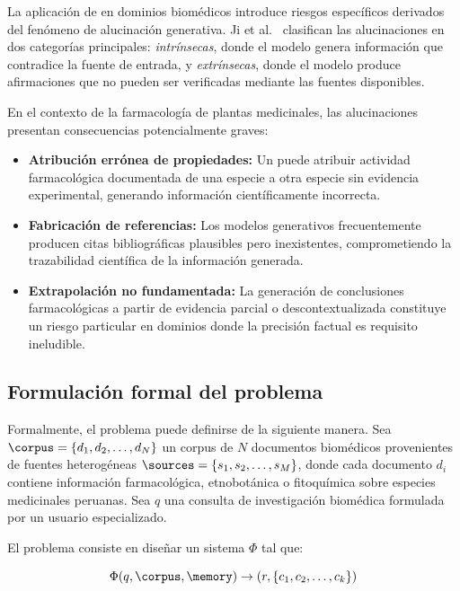 La aplicación de \llms{} en dominios biomédicos introduce riesgos específicos derivados del fenómeno de alucinación generativa. Ji et al.~\cite{ji2023survey} clasifican las alucinaciones en dos categorías principales: \textit{intrínsecas}, donde el modelo genera información que contradice la fuente de entrada, y \textit{extrínsecas}, donde el modelo produce afirmaciones que no pueden ser verificadas mediante las fuentes disponibles.

En el contexto de la farmacología de plantas medicinales, las alucinaciones presentan consecuencias potencialmente graves:

\begin{itemize}[leftmargin=*]
  \item \textbf{Atribución errónea de propiedades:} Un \llm{} puede atribuir actividad farmacológica documentada de una especie a otra especie sin evidencia experimental, generando información científicamente incorrecta.

  \item \textbf{Fabricación de referencias:} Los modelos generativos frecuentemente producen citas bibliográficas plausibles pero inexistentes, comprometiendo la trazabilidad científica de la información generada.

  \item \textbf{Extrapolación no fundamentada:} La generación de conclusiones farmacológicas a partir de evidencia parcial o descontextualizada constituye un riesgo particular en dominios donde la precisión factual es requisito ineludible.
\end{itemize}

\subsection{Formulación formal del problema}
\label{subsec:formal_problem}

Formalmente, el problema puede definirse de la siguiente manera. Sea $\corpus = \{d_1, d_2, \ldots, d_N\}$ un corpus de $N$ documentos biomédicos provenientes de fuentes heterogéneas $\sources = \{s_1, s_2, \ldots, s_M\}$, donde cada documento $d_i$ contiene información farmacológica, etnobotánica o fitoquímica sobre especies medicinales peruanas. Sea $q$ una consulta de investigación biomédica formulada por un usuario especializado.

El problema consiste en diseñar un sistema $\Phi$ tal que:

\begin{equation}
\label{eq:problem_formulation}
  \Phi(q, \corpus, \memory) \rightarrow (r, \{c_1, c_2, \ldots, c_k\})
\end{equation}


